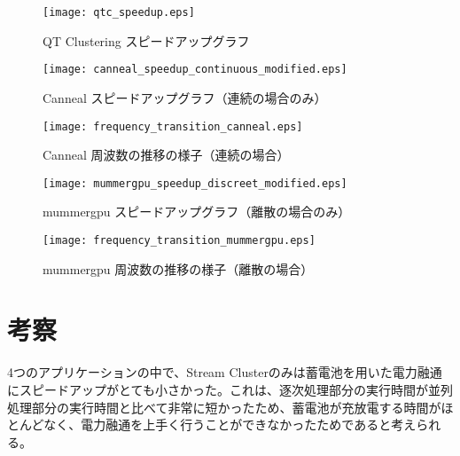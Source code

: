 \begin{figure}[t]
 \begin{center}
  \texttt{[image: qtc\_speedup.eps]}
 \end{center}
 \caption{QT Clustering スピードアップグラフ}
 \label{fig:qtclustering_speedup}
\end{figure}


\begin{figure}[t]
 \begin{center}
  \texttt{[image: canneal\_speedup\_continuous\_modified.eps]}
 \end{center}
 \caption{Canneal スピードアップグラフ（連続の場合のみ）}
 \label{fig:canneal_speedup_continuous}
\end{figure}

\begin{figure}[t]
 \begin{center}
  \texttt{[image: frequency\_transition\_canneal.eps]}
 \end{center}
 \caption{Canneal 周波数の推移の様子（連続の場合）}
 \label{fig:frequency_transition_canneal}
\end{figure}

\begin{figure}[t]
 \begin{center}
  \texttt{[image: mummergpu\_speedup\_discreet\_modified.eps]}
 \end{center}
 \caption{mummergpu スピードアップグラフ（離散の場合のみ）}
 \label{fig:mummergpu_speedup_discreet}
\end{figure}

\begin{figure}[t]
 \begin{center}
  \texttt{[image: frequency\_transition\_mummergpu.eps]}
 \end{center}
 \caption{mummergpu 周波数の推移の様子（離散の場合）}
 \label{fig:frequency_transition_mummergpu}
\end{figure}


\section{考察}
\label{sec:discussion}

4つのアプリケーションの中で、Stream Clusterのみは蓄電池を用いた電力融通にスピードアップがとても小さかった。これは、逐次処理部分の実行時間が並列処理部分の実行時間と比べて非常に短かったため、蓄電池が充放電する時間がほとんどなく、電力融通を上手く行うことができなかったためであると考えられる。

